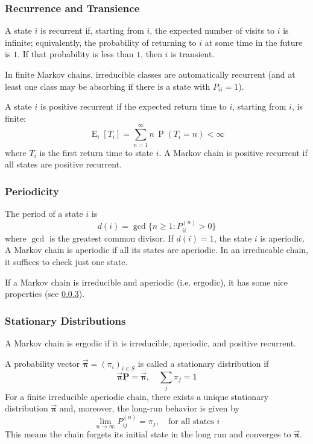 \documentclass[10pt, headings=standardclasses, parskip=half, twoside]{scrartcl}
\renewcommand{\emph}[1]{\textcolor{mypurple}{#1}}
\newcommand{\matr}[1]{\underline{\boldsymbol{#1}}}
\newcommand{\vect}[1]{\vec{\boldsymbol{#1}}}
\newcommand{\Exp}{\operatorname{E}}
\newcommand{\Prob}{\operatorname{P}}
\begin{document}
\subsubsection{Recurrence and Transience}
\label{subsubsec:recurrence_transience}
\begin{definition}\label{def:recurrence_transience}
A state \(i\) is \emph{recurrent} if, starting from \(i\), the expected number of visits to \(i\) is infinite;
equivalently, the probability of returning to \(i\) at some time in the future is \(1\).
If that probability is less than \(1\), then \(i\) is \emph{transient}.
\end{definition}
In finite Markov chains, irreducible classes are automatically recurrent (and at least one class may be absorbing if there is a state with \(P_{ii}=1\)).

\begin{definition}\label{def:posrec}
A state \(i\) is \emph{positive recurrent} if the expected return time to \(i\), starting from \(i\), is finite:
\[
\Exp_i[T_i]=\sum_{n=1}^{\infty} n\,\Prob(T_i=n)<\infty
\]
where \(T_i\) is the first return time to state \(i\).
A Markov chain is positive recurrent if all states are positive recurrent.
\end{definition}

\subsubsection{Periodicity}
\label{subsubsec:periodicity}

\begin{definition}[Period]\label{def:period}
  The \emph{period} of a state \(i\) is
  \[
  d(i)=\gcd\{n\ge 1: P_{ii}^{(n)}>0\}
  \]
  where \(\gcd\) is the greatest common divisor.
  If \(d(i)=1\), the state \(i\) is \emph{aperiodic}.
  A Markov chain is \emph{aperiodic} if all its states are aperiodic.
  In an irreducable chain, it suffices to check just one state.
\end{definition}
If a Markov chain is irreducible and aperiodic (i.e. ergodic), it has some nice properties (see \ref{subsubsec:stationary_distributions}).

\subsubsection{Stationary Distributions}\label{subsubsec:stationary_distributions}
\begin{definition}[Ergodicity]\label{def:ergodic}
A Markov chain is \emph{ergodic} if it is irreducible, aperiodic, and positive recurrent. 
\end{definition}
A probability vector \(\vect{\pi}=(\pi_i)_{i\in S}\) is called a \emph{stationary distribution} if
\[
\vect{\pi} \matr{P}=\vect{\pi},\quad \sum_{j}\pi_j=1
\]
For a finite irreducible aperiodic chain, there exists a unique stationary distribution \(\vect{\pi}\) and, moreover, the long-run behavior is given by
\[
\lim_{n\to\infty} P_{ij}^{(n)}=\pi_j,\quad \text{for all states } i
\]
This means the chain forgets its initial state in the long run and converges to \(\vect{\pi}\).
\end{document}
